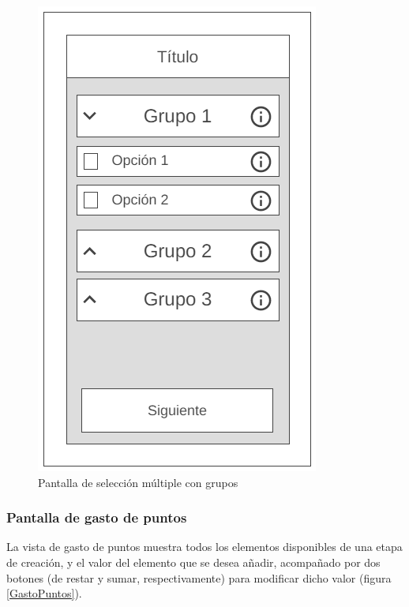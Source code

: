 \begin{figure}[H]
    \centering
    \includegraphics[scale=0.3]{Figures/Mockups/Mock_SeleccionMultipleGrupos.png}
    \caption{Pantalla de selección múltiple con grupos}
    \label{SeleccionMultipleGrupos}    
\end{figure}

\subsubsection{Pantalla de gasto de puntos}
La vista de gasto de puntos muestra todos los elementos disponibles de una etapa de creación, y el valor del elemento 
que se desea añadir, acompañado por dos botones (de restar y sumar, respectivamente) para modificar dicho valor 
(figura \ref*{GastoPuntos}).

